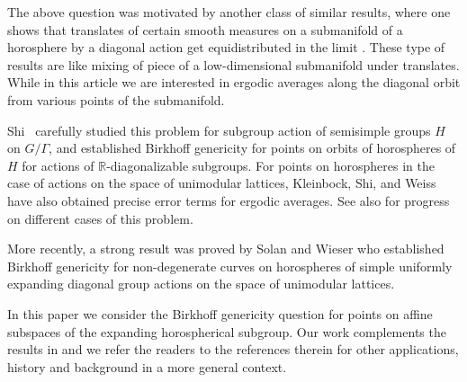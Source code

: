 \documentclass[12pt,reqno]{amsart}
\numberwithin{equation}{section}
\theoremstyle{plain}
\theoremstyle{definition}
\theoremstyle{remark}
\newcommand{\R}{\mathbb{R}}
\begin{document}
The above question was motivated by another class of similar results, where one shows that translates of certain smooth measures on a submanifold of a horosphere by a diagonal action get equidistributed in the limit \cite{KM98, Shah:Dirichlet,Yan20Invent}. These type of results are like mixing of piece of a low-dimensional submanifold under translates. While in this article we are interested in ergodic averages along the diagonal orbit from various points of the submanifold.   

Shi~\cite{Shi20} carefully studied this problem for subgroup action of semisimple groups $H$ on $G/\Gamma$, and established Birkhoff genericity for points on orbits of horospheres of $H$ for actions of $\R$-diagonalizable subgroups. For points on horospheres in the case of actions on the space of unimodular lattices, Kleinbock, Shi, and Weiss \cite{KSW17} have also obtained precise error terms for ergodic averages. See also \cite{FSU18, Kha20, Zha21} for progress on different cases of this problem.

More recently, a strong result was proved by Solan and Wieser \cite{SolanWeiser25} who established Birkhoff genericity for non-degenerate curves on horospheres of simple uniformly expanding diagonal group actions on the space of unimodular lattices. 

In this paper we consider the Birkhoff genericity question for points on affine subspaces of the expanding horospherical subgroup. Our work complements the results in \cite{Shi20, KSW17,EinsiedlerShi19, SolanWeiser25} and we refer the readers to the references therein for other applications, history and background in a more general context. 
\end{document}

